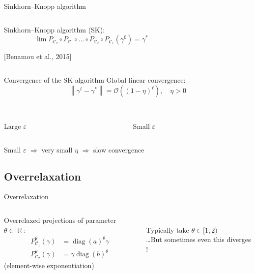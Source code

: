 \documentclass[compress]{beamer}
\DeclareMathOperator{\IR}{\mathbb{R}}
\DeclareMathOperator{\Ccal}{\mathcal{C}}
\DeclareMathOperator{\diag}{diag}
\newcommand{\norm}[1]{\left\lVert #1 \right\rVert}
\renewcommand{\epsilon}{\varepsilon}
\begin{document}
\begin{frame}{Sinkhorn--Knopp algorithm}
	
	\begin{columns}
	\begin{column}{0.6\textwidth}

	Sinkhorn--Knopp algorithm (SK):
	\[
	\lim P_{\Ccal_2}\circ P_{\Ccal_1} \circ \ldots \circ P_{\Ccal_2} \circ P_{\Ccal_1} (\gamma^0) = \gamma^*
	\]
	
	{\color{blue} [Benamou et al., 2015]}
	
\end{column}

\begin{column}{0.4\textwidth}
	\centering
	
\end{column}
\end{columns}
\end{frame}

\begin{frame}{Convergence of the SK algorithm}
Global linear convergence:
\[ \norm{\gamma^\ell - \gamma^*} = \mathcal{O}\left((1-\eta)^\ell \right) , \quad \eta > 0 \]

\begin{columns}
	\begin{column}{0.5\textwidth}
		\centering
		\\
		Large $\epsilon$
	\end{column}
	\begin{column}{0.5\textwidth}
		\centering
		\\
		Small $\epsilon$
	\end{column}
\end{columns}

Small $\epsilon$ $\Longrightarrow$
very small $\eta$ $\Longrightarrow$
slow convergence
\end{frame}

\subsection{Overrelaxation}
\begin{frame}{Overrelaxation}
	\begin{columns}
		\begin{column}{0.6\textwidth}
			Overrelaxed projections of parameter $\theta \in \IR$:
			\begin{align*}\label{or_scaling}
			P_{\Ccal_1}^\theta(\gamma) &= \diag(a)^\theta \gamma\\
			P_{\Ccal_2}^\theta(\gamma) &= \gamma \diag(b)^\theta \nonumber
			\end{align*}
			(element-wise exponentiation)
		\end{column}
		\begin{column}{0.4\textwidth}
			\centering
			\\
			Typically take $\theta \in [1,2)$ \pause \\
			\ldots But sometimes even this diverges !
		\end{column}
	\end{columns}
\end{frame}
\end{document}
